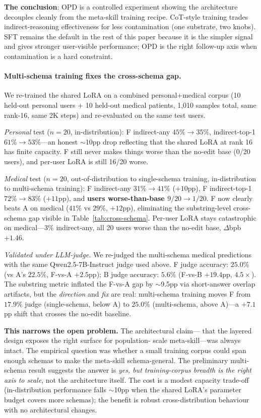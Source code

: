 \documentclass{article}
\begin{document}
\textbf{The conclusion}: OPD is a controlled experiment showing
the architecture decouples cleanly from the meta-skill training
recipe. CoT-style training trades indirect-reasoning effectiveness
for less contamination (one substrate, two knobs). SFT remains the
default in the rest of this paper because it is the simpler signal
and gives stronger user-visible performance; OPD is the right
follow-up axis when contamination is a hard constraint.

\paragraph{Multi-schema training fixes the cross-schema gap.}
We re-trained the shared LoRA on a combined personal+medical corpus
(10 held-out personal users $+$ 10 held-out medical patients, 1{,}010
samples total, same rank-16, same 2K steps) and re-evaluated on the
same test users.

\emph{Personal} test ($n{=}20$, in-distribution): F indirect-any
$45\% \to 35\%$, indirect-top-1 $61\% \to 53\%$—an honest
$\sim$10pp drop reflecting that the shared LoRA at rank 16 has finite
capacity. F still never makes things worse than the no-edit base
(0/20 users), and per-user LoRA is still 16/20 worse.

\emph{Medical} test ($n{=}20$, out-of-distribution to single-schema
training, in-distribution to multi-schema training):
F indirect-any $31\% \to 41\%$ ($+10$pp), F indirect-top-1
$72\% \to 83\%$ ($+11$pp), and \textbf{users worse-than-base
$9/20 \to 1/20$}. F now clearly beats A on medical ($41\%$ vs $29\%$,
$+12$pp), eliminating the substring-level cross-schema gap visible
in Table~\ref{tab:cross-schema}. Per-user LoRA stays catastrophic on
medical—$3\%$ indirect-any, all 20 users worse than the no-edit
base, $\Delta$bpb $+1.46$.

\emph{Validated under LLM-judge.} We re-judged the multi-schema
medical predictions with the same Qwen2.5-7B-Instruct judge used
above. F judge accuracy: $25.0\%$ (vs A's $22.5\%$, F-vs-A
$+2.5$pp); B judge accuracy: $5.6\%$ (F-vs-B $+19.4$pp,
$4.5{\times}$). The substring metric inflated the F-vs-A gap by
$\sim$9.5pp via short-answer overlap artifacts, but the
\emph{direction} and \emph{fix} are real: multi-schema training
moves F from $17.9\%$ judge (single-schema, below A) to $25.0\%$
(multi-schema, above A)—a $+7.1$pp shift that crosses the
no-edit baseline.

\textbf{This narrows the open problem.} The architectural claim—
that the layered design exposes the right surface for population-
scale meta-skill—was always intact. The empirical question was
whether a small training corpus could span enough schemas to make
the meta-skill schema-general. The preliminary multi-schema result
suggests the answer is \emph{yes, but training-corpus breadth is
the right axis to scale}, not the architecture itself. The cost is
a modest capacity trade-off (in-distribution performance falls
$\sim$10pp when the shared LoRA's parameter budget covers more
schemas); the benefit is robust cross-distribution behaviour with
no architectural changes.
\end{document}
